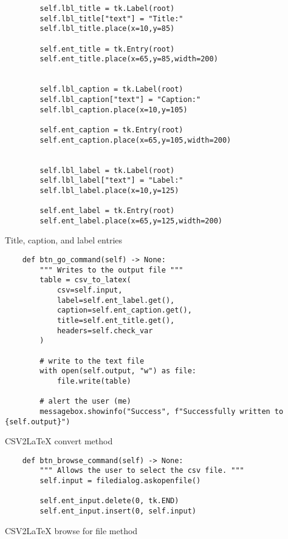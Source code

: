 \newpage
\begin{listing}[!ht]
    \begin{verbatim}
        self.lbl_title = tk.Label(root)
        self.lbl_title["text"] = "Title:"
        self.lbl_title.place(x=10,y=85)
        
        self.ent_title = tk.Entry(root)
        self.ent_title.place(x=65,y=85,width=200)
        
        
        self.lbl_caption = tk.Label(root)
        self.lbl_caption["text"] = "Caption:"
        self.lbl_caption.place(x=10,y=105)
        
        self.ent_caption = tk.Entry(root)
        self.ent_caption.place(x=65,y=105,width=200)
        
        
        self.lbl_label = tk.Label(root)
        self.lbl_label["text"] = "Label:"
        self.lbl_label.place(x=10,y=125)
        
        self.ent_label = tk.Entry(root)
        self.ent_label.place(x=65,y=125,width=200)
    \end{verbatim}
    \caption{Title, caption, and label entries}
    \label{sc:csv2latex-gui-init-3}
\end{listing}

\newpage
\begin{listing}[!ht]
    \begin{verbatim}
    def btn_go_command(self) -> None:
        """ Writes to the output file """
        table = csv_to_latex(
            csv=self.input,
            label=self.ent_label.get(),
            caption=self.ent_caption.get(),
            title=self.ent_title.get(),
            headers=self.check_var
        )
        
        # write to the text file
        with open(self.output, "w") as file:
            file.write(table)
            
        # alert the user (me)
        messagebox.showinfo("Success", f"Successfully written to {self.output}")
    \end{verbatim}
    \caption{CSV2LaTeX convert method}
    \label{sc:csv2latex-convert-method}
\end{listing}

\newpage
\begin{listing}[!ht]
    \begin{verbatim}
    def btn_browse_command(self) -> None:
        """ Allows the user to select the csv file. """
        self.input = filedialog.askopenfile()

        self.ent_input.delete(0, tk.END)
        self.ent_input.insert(0, self.input)
    \end{verbatim}
    \caption{CSV2LaTeX browse for file method}
    \label{sc:csv2latex-browse-method}
\end{listing}

